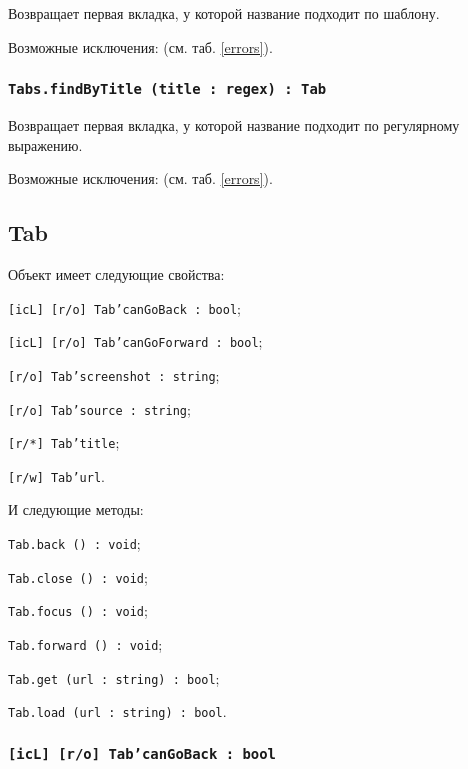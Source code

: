 Возвращает первая вкладка, у которой название подходит по шаблону.

Возможные исключения:  (см. таб. \ref{errors}).

\subsubsection{\texttt{Tabs.findByTitle (title : regex) : Tab}}

Возвращает первая вкладка, у которой название подходит по регулярному выражению.

Возможные исключения:  (см. таб. \ref{errors}).

\subsection{{\color{orange} Tab}}

Объект \tab{} имеет следующие свойства:
\begin{icItems}
	\item \texttt{[icL] [r/o] Tab'canGoBack : bool};
	\item \texttt{[icL] [r/o] Tab'canGoForward : bool};
	\item \texttt{[r/o] Tab'screenshot : string};
	\item \texttt{[r/o] Tab'source : string};
	\item \texttt{[r/*] Tab'title};
	\item \texttt{[r/w] Tab'url}.
\end{icItems}

И следующие методы:
\begin{icItems}
	\item \texttt{Tab.back () : void};
	\item \texttt{Tab.close () : void};
	\item \texttt{Tab.focus () : void};
	\item \texttt{Tab.forward () : void};
	\item \texttt{Tab.get (url : string) : bool};
	\item \texttt{Tab.load (url : string) : bool}.
\end{icItems}

\subsubsection{\texttt{[icL] [r/o] Tab'canGoBack : bool}}


